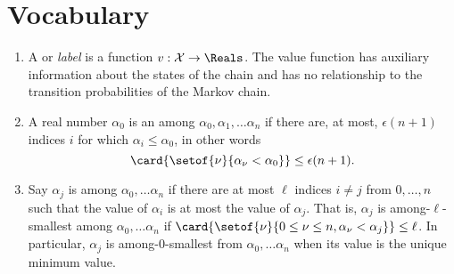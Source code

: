 \documentclass[12pt]{article}
\begin{document}
\section*{Vocabulary}
\begin{enumerate}
    \item
        A  or \emph{label} is a function \( v :
        \mathcal{X} \to \Reals \).  The value function has auxiliary
        information about the states of the chain and has no
        relationship to the transition probabilities of the Markov
        chain.
    \item
        A real number \( \alpha_0 \) is an 
        among \( \alpha_0, \alpha_1, \dots \alpha_n \) if there are, at
        most, \( \epsilon(n + 1) \) indices \( i \) for which \( \alpha_i
        \le \alpha_0 \), in other words
        \[
            \card{ \setof{\nu}{\alpha_{\nu} < \alpha_0}} \le \epsilon(n+1).
        \]

    \item
        Say \( \alpha_j \) is  among \(
        \alpha_0, \dots \alpha_n \) if there are at most \( \ell \)
        indices \( i \ne j \) from \( 0, \dots, n \) such that the value
        of \( \alpha_i \) is at most the value of \( \alpha_j \).  That
        is, \( \alpha_j \) is among-\( \ell \)-smallest among \( \alpha_0,
        \dots \alpha_n \) if \( \card{ \setof{\nu}{0 \le \nu \le n,
        \alpha_\nu < \alpha_j}} \le \ell \).  In particular, \( \alpha_j
        \) is among-\( 0 \)-smallest from \( \alpha_0, \dots \alpha_n \)
        when its value is the unique minimum value.
\end{enumerate}

\hr
\end{document}
